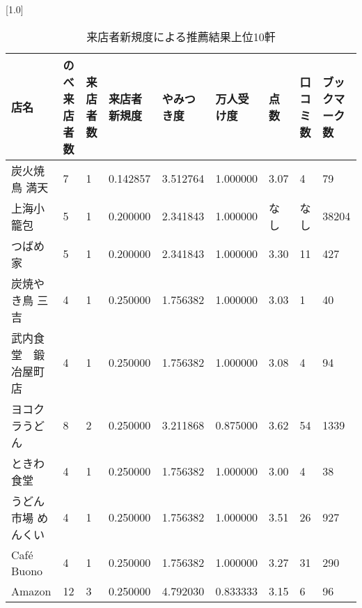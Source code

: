 \begin{table}[H]
\centering
\caption{来店者新規度による推薦結果上位10軒}
\label{table::VN}
\small
\scalebox{0.7}[1.0]{
\begin{tabular}{|l|l|l|l|l|l|l|l|l|}
\hline
店名         & のべ来店者数 & 来店者数 & 来店者新規度   & やみつき度    & 万人受け度    & 点数    & 口コミ数  & ブックマーク数 \\ \hline
炭火焼鳥 満天    & 7      & 1    & 0.142857 & 3.512764 & 1.000000 & 3.07  & 4     & 79      \\ \hline
上海小籠包      & 5      & 1    & 0.200000 & 2.341843 & 1.000000 & なし & なし & 38204   \\ \hline
つばめ家       & 5      & 1    & 0.200000 & 2.341843 & 1.000000 & 3.30  & 11    & 427     \\ \hline
炭焼やき鳥 三吉   & 4      & 1    & 0.250000 & 1.756382 & 1.000000 & 3.03  & 1     & 40      \\ \hline
武内食堂　鍛冶屋町店 & 4      & 1    & 0.250000 & 1.756382 & 1.000000 & 3.08  & 4     & 94      \\ \hline
ヨコクラうどん    & 8      & 2    & 0.250000 & 3.211868 & 0.875000 & 3.62  & 54    & 1339    \\ \hline
ときわ食堂      & 4      & 1    & 0.250000 & 1.756382 & 1.000000 & 3.00  & 4     & 38      \\ \hline
うどん市場 めんくい & 4      & 1    & 0.250000 & 1.756382 & 1.000000 & 3.51  & 26    & 927     \\ \hline
Café Buono & 4      & 1    & 0.250000 & 1.756382 & 1.000000 & 3.27  & 31    & 290     \\ \hline
Amazon     & 12     & 3    & 0.250000 & 4.792030 & 0.833333 & 3.15  & 6     & 96      \\ \hline
\end{tabular}
}
\end{table}
